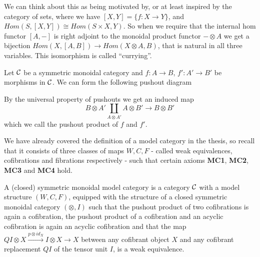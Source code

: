 We can think about this as being motivated by, or at least inspired by the category of sets, where we have $[X,Y]=\{ f:X\rightarrow Y\}$, and $Hom(S, [X, Y])\cong Hom(S\times X, Y)$. So when we require that the internal hom functor $[A,-]$ is right adjoint to the monoidal product functor $-\otimes A$ we get a bijection $Hom(X, [A, B])\rightarrow Hom(X\otimes A, B)$, that is natural in all three variables. This isomorphism is called ``currying''.

\begin{definition}
Let $\mathcal{C}$ be a symmetric monoidal category and $f\colon A\to B$, $f'\colon A'\to B'$ be morphisms in $\mathcal{C}$. We can form the following pushout diagram
\begin{center}
\end{center}
By the universal property of pushouts we get an induced map
\begin{equation*}
    B\otimes A' \coprod_{A\otimes A'} A\otimes B' \longrightarrow B\otimes B'
\end{equation*}
which we call the pushout product of $f$ and $f'$. 
\end{definition}

We have already covered the definition of a model category in the thesis, so recall that it consists of three classes of maps $W, C, F$ - called weak equivalences, cofibrations and fibrations respectively - such that certain axioms \textbf{MC1}, \textbf{MC2}, \textbf{MC3} and \textbf{MC4} hold. 

\begin{definition}
A (closed) symmetric monoidal model category is a category $\mathcal{C}$ with a model structure $(W, C, F)$, equipped with the structure of a closed symmetric monoidal category $(\otimes, I)$ such that the pushout product of two cofibrations is again a cofibration, the pushout product of a cofibration and an acyclic cofibration is again an acyclic cofibration and that the map $QI\otimes X \overset{p\otimes id_X}\to I\otimes X \to X$ between any cofibrant object $X$ and any cofibrant replacement $QI$ of the tensor unit $I$, is a weak equivalence. 
\end{definition}

